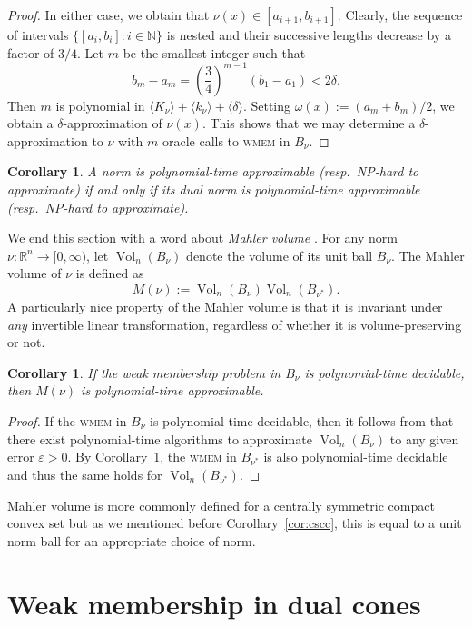 \documentclass[11pt,reqno]{amsart}
\newtheorem{corollary}[theorem]{Corollary}
\theoremstyle{definition}
\theoremstyle{remark}
\begin{document}
\begin{proof}
In either case, we obtain that $\nu(x)\in [a_{i+1},b_{i+1}]$.
Clearly, the sequence of intervals $\{[a_i,b_i] : i\in\mathbb{N} \}$ is nested and their successive lengths decrease by a factor of $3/4$.
Let $m$ be the smallest integer such that
\[b_m-a_m=
\left(\frac{3}{4}\right)^{m-1}(b_1-a_1)<2\delta.
\]
Then $m$ is polynomial in 
$\langle K_\nu \rangle+\langle k_\nu \rangle+\langle \delta \rangle$.  
Setting $\omega(x):=(a_m+b_m)/2$,  we obtain a $\delta$-approximation of $\nu(x)$.  This shows that we may determine a $\delta$-approximation to $\nu$ with $m$ oracle calls to  \textsc{wmem} in $B_\nu$.
\end{proof}

\begin{corollary}\label{cor:polduality}
A norm is polynomial-time approximable (resp.\ NP-hard to approximate) if and only if its dual norm is polynomial-time approximable (resp.\ NP-hard to approximate).
\end{corollary}

We end this section with a word about \emph{Mahler volume} \cite{BM87}. For any norm $\nu:\mathbb{R}^n\to [0,\infty)$, let 
$\operatorname{Vol}_n(B_{\nu})$ denote the volume of its unit ball $B_\nu$.  The Mahler volume of $\nu$ is defined as
\[
M(\nu):=\operatorname{Vol}_n(B_{\nu})\operatorname{Vol}_n(B_{\nu^*}).
\]
A particularly nice property of the Mahler volume is that it is invariant under \emph{any} invertible linear transformation, regardless of whether it is volume-preserving or not.
 
\begin{corollary}
If the weak membership problem in $B_{\nu}$ is polynomial-time decidable, then $M(\nu)$ is polynomial-time approximable.
\end{corollary}
\begin{proof}
If the \textsc{wmem} in $B_\nu$ is polynomial-time decidable, then it follows from \cite{DFK91} that there exist polynomial-time algorithms to approximate $\operatorname{Vol}_n(B_{\nu})$ to any given error $\varepsilon>0$. By Corollary~\ref{cor:polduality}, the \textsc{wmem} in $B_{\nu^*}$ is also polynomial-time 
decidable and thus the same holds for  $\operatorname{Vol}_n(B_{\nu^*})$.
\end{proof}
Mahler volume is more commonly defined for a centrally symmetric compact convex set but as we mentioned before Corollary~\ref{cor:cscc}, this is equal to a 
unit norm ball for an appropriate choice of norm.

\section{Weak membership in dual cones}\label{sec:cones}
\end{document}
